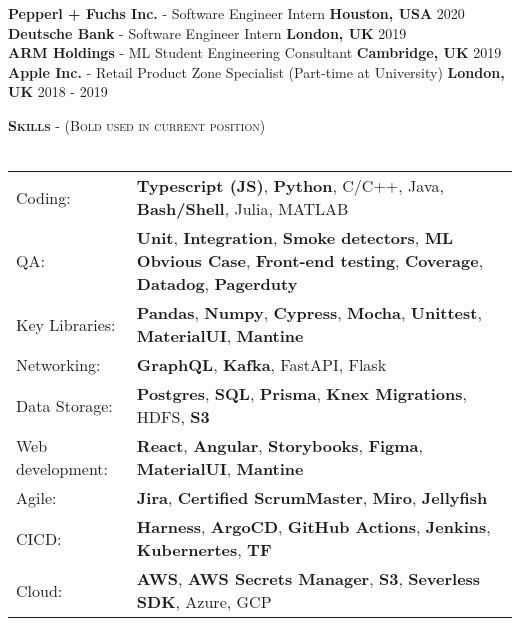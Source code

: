 \documentclass[a4paper]{article}
\newcommand{\lineunder} {
    \vspace*{-8pt} \\
    \hspace*{-28pt} \hrulefill \\
}
\newcommand{\header} [1] {
    {\hspace*{-28pt}\vspace*{6pt} \textsc{#1}}
    \vspace*{-2pt} \lineunder
}
\begin{document}
\textbf{Pepperl + Fuchs Inc.} - Software Engineer Intern \hfill \textbf{Houston, USA}  2020 \\
\vspace{2mm}
\textbf{Deutsche Bank} - Software Engineer Intern \hfill \textbf{London, UK}  2019 \\
\vspace{2mm}
\textbf{ARM Holdings} - ML Student Engineering Consultant \hfill \textbf{Cambridge, UK}  2019 \\
\vspace{2mm}
\textbf{Apple Inc.} - Retail Product Zone Specialist (Part-time at University) \hfill \textbf{London, UK}  2018 - 2019\\

\vspace{2mm}

\header{\textbf{Skills} - (Bold used in current position)}

\vspace{2mm}
\begin{tabular} {p{3.5cm} p{11.5cm} }
    Coding:          & \textbf{Typescript (JS)}, \textbf{Python}, C/C++, Java, \textbf{Bash/Shell}, Julia, MATLAB                                                                                   \\
    QA:              & \textbf{Unit}, \textbf{Integration}, \textbf{Smoke detectors}, \textbf{ML Obvious Case}, \textbf{Front-end testing}, \textbf{Coverage}, \textbf{Datadog}, \textbf{Pagerduty} \\
    Key Libraries:   & \textbf{Pandas}, \textbf{Numpy}, \textbf{Cypress}, \textbf{Mocha}, \textbf{Unittest}, \textbf{MaterialUI}, \textbf{Mantine}                                                  \\
    Networking:      & \textbf{GraphQL}, \textbf{Kafka}, FastAPI, Flask                                                                                                                             \\
    Data Storage:    & \textbf{Postgres}, \textbf{SQL}, \textbf{Prisma}, \textbf{Knex Migrations}, HDFS, \textbf{S3}                                                                                \\
    Web development: & \textbf{React}, \textbf{Angular}, \textbf{Storybooks}, \textbf{Figma}, \textbf{MaterialUI}, \textbf{Mantine}                                                                 \\
    Agile:           & \textbf{Jira}, \textbf{Certified ScrumMaster}, \textbf{Miro}, \textbf{Jellyfish}                                                                                             \\
    CICD:            & \textbf{Harness}, \textbf{ArgoCD}, \textbf{GitHub Actions},  \textbf{Jenkins}, \textbf{Kubernertes}, \textbf{TF}                                                             \\
    Cloud:           & \textbf{AWS}, \textbf{AWS Secrets Manager},  \textbf{S3}, \textbf{Severless SDK}, Azure, GCP
\end{tabular}

\normalsize
\end{document}
